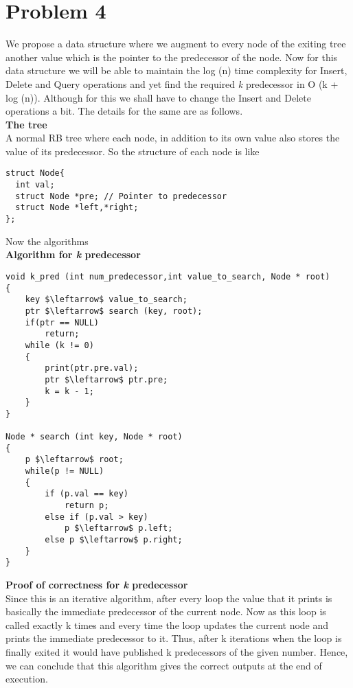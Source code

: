 \documentclass[a4paper,11pt]{article}
\theoremstyle{mytheor}
\begin{document}
\section*{Problem 4}
We propose a data structure where we augment to every node of the exiting tree another value which is the pointer to the predecessor of the node. Now for this data structure we will be able to maintain the log (n) time complexity for Insert, Delete and Query operations and yet find the required \textit{k} predecessor in  O (k + log (n)). Although for this we shall have to change the Insert and Delete operations a bit. The details for the same are as follows.\\
\textbf{The tree}\\
A normal RB tree where each node, in addition to its own value also stores the value of its predecessor. So the structure of each node is like\\
\begin{lstlisting}[label={list:first},caption=Node Structure.]
struct Node{
  int val;
  struct Node *pre;	// Pointer to predecessor
  struct Node *left,*right;  
};
\end{lstlisting}
Now the algorithms\\
\textbf{Algorithm for \textit{k} predecessor}\\
\begin{lstlisting}[label={list:first},caption=k predecessor, mathescape = true]
void k_pred (int num_predecessor,int value_to_search, Node * root)
{
	key $\leftarrow$ value_to_search;
	ptr $\leftarrow$ search (key, root);
	if(ptr == NULL)
		return;
	while (k != 0)
	{
		print(ptr.pre.val);
		ptr $\leftarrow$ ptr.pre;
		k = k - 1;	
	}
}

Node * search (int key, Node * root)
{
	p $\leftarrow$ root;
	while(p != NULL)
	{
		if (p.val == key)
			return p;
		else if (p.val > key)
			p $\leftarrow$ p.left;
		else p $\leftarrow$ p.right;
	}
}
\end{lstlisting}
\textbf{Proof of correctness for \textit{k} predecessor}\\
Since this is an iterative algorithm, after every loop the value that it prints is basically the immediate predecessor of the current node. Now as this loop is called exactly k times and every time the loop updates the current node and prints the immediate predecessor to it. Thus, after k iterations when the loop is finally exited it would have published k predecessors of the given number.
Hence, we can conclude that this algorithm gives the correct outputs at the end of execution.\\
\end{document}
